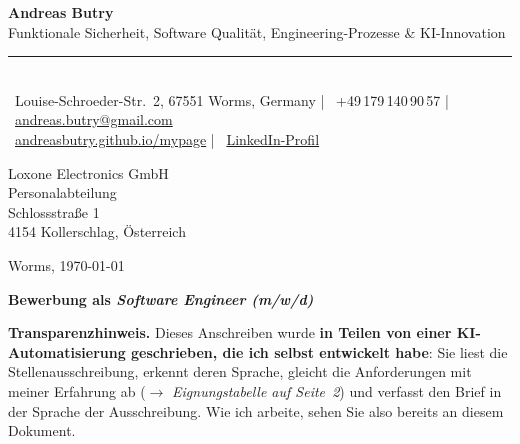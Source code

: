 \documentclass[10pt,a4paper]{moderncv}   %
\begin{document}
{\Huge\bfseries\color{accent}Andreas Butry}\\[1pt]
{\small\color{light}Funktionale Sicherheit, Software Qualität, Engineering-Prozesse \& KI-Innovation}\\[5pt]
{\color{accent}\rule{\linewidth}{1pt}}\\[4pt]
{\small\color{ink}%
\faLocationDot~Louise-Schroeder-Str.\ 2, 67551 Worms, Germany \;\textcolor{accent}{|}\;
\faPhone~+49\,179\,140\,90\,57 \;\textcolor{accent}{|}\;
\faEnvelope~\href{mailto:andreas.butry@gmail.com}{andreas.butry@gmail.com}\\[3pt]
\faGlobe~\href{https://andreasbutry.github.io/mypage/}{andreasbutry.github.io/mypage} \;\textcolor{accent}{|}\;
\faLinkedin~\href{https://www.linkedin.com/in/andreas-butry-23641530a}{LinkedIn-Profil}}

\bigskip

\begin{minipage}[t]{0.62\linewidth}
  Loxone Electronics GmbH\\
  Personalabteilung\\
  Schlossstraße 1\\
  4154 Kollerschlag, Österreich
\end{minipage}\hfill
\begin{minipage}[t]{0.33\linewidth}
  \raggedleft Worms, \today
\end{minipage}

\bigskip

{\bfseries Bewerbung als \emph{Software Engineer (m/w/d)}}

\medskip

\begin{tcolorbox}[colback=notebg,colframe=accent,boxrule=0.8pt,arc=3pt,
                  left=8pt,right=8pt,top=5pt,bottom=5pt]
{\small\color{ink}\faRobot\enspace\textbf{Transparenzhinweis.}
Dieses Anschreiben wurde \textbf{in Teilen von einer KI-Automatisierung
geschrieben, die ich selbst entwickelt habe}: Sie liest die
Stellenausschreibung, erkennt deren Sprache, gleicht die Anforderungen mit
meiner Erfahrung ab ($\rightarrow$ \emph{Eignungstabelle auf Seite~2}) und
verfasst den Brief in der Sprache der Ausschreibung. Wie ich arbeite, sehen Sie
also bereits an diesem Dokument.}
\end{tcolorbox}
\end{document}
